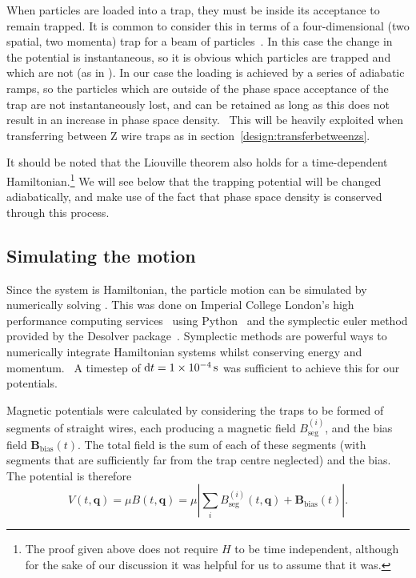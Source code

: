 \begin{figure}[tbh]
\centering
  \caption{}
  \label{design:fig:acceptance}
\end{figure}

When particles are loaded into a trap, they must be inside its acceptance to
remain trapped. It is common to consider this in terms of a four-dimensional
(two spatial, two momenta) trap for a beam of particles~\cite{Crompvoets2005}.
In this case the change in the potential is instantaneous, so it is obvious
which particles are trapped and which are not (as in
). In our case the loading is achieved by
a series of adiabatic ramps, so the particles which are outside of the phase
space acceptance of the trap are not instantaneously lost, and can be retained
as long as this does not result in an increase in phase space density.~\cite{}
 This will be heavily exploited when
transferring between Z wire traps as in section~\ref{design:transferbetweenzs}.

It should be noted that the Liouville theorem also holds for a time-dependent
Hamiltonian.\footnote{The proof given above does not require $H$ to be time
independent, although for the sake of our discussion it was helpful for us to
assume that it was.} We will see below that the trapping potential will be changed
adiabatically, and make use of the fact that phase space density is conserved
through this process.

\subsection{Simulating the motion}
\label{design:motion:simmethods}


Since the system is Hamiltonian, the particle motion can be simulated by
numerically solving . This was done on Imperial
College London's high performance computing services~\cite{ICRCS} using
Python~\cite{python} and the symplectic euler method provided by the Desolver
package~\cite{desolver}. Symplectic methods are powerful ways to numerically
integrate Hamiltonian systems whilst conserving energy and
momentum.~\cite{Hairer2015} A timestep of $\dd t = \SI{1E-4}{\second}$ was
sufficient to achieve this for our potentials.

Magnetic potentials were calculated by considering the traps to be formed of
segments of straight wires, each producing a magnetic field
$B_\text{seg}^{(i)}$, and the bias field $\mathbf{B}_\text{bias}(t)$. The total
field is the sum of each of these segments (with segments that are sufficiently
far from the trap centre neglected) and the bias. The potential is therefore
%
\begin{equation} V(t, \mathbf{q}) = \mu B (t, \mathbf{q}) = \mu \left| \sum_i
B_\text{seg}^{(i)}(t, \mathbf{q}) + \mathbf{B}_\text{bias}(t)\right|.
\end{equation}

